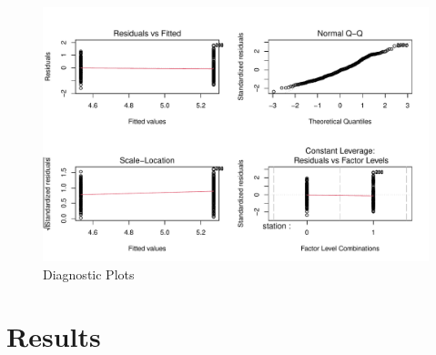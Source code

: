 \documentclass[a4paper, 11pt]{article}
\begin{document}
\begin{figure}
    \centering
    \includegraphics[scale=0.8]{figures/logplot.pdf}
    \caption{Diagnostic Plots}
    \label{fig:diagnostic}
\end{figure}



\section{Results} \label{sec:results}
\end{document}
